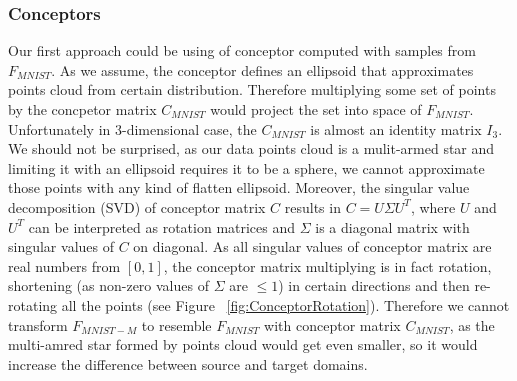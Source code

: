 \documentclass{article}
\begin{document}
\subsubsection{Conceptors}
\par
Our first approach could be using of conceptor computed with samples from $F_{MNIST}$. As we assume, the conceptor defines an ellipsoid that approximates points cloud from certain distribution. Therefore multiplying some set of points by the concpetor matrix $C_{MNIST}$ would project the set into space of $F_{MNIST}$. Unfortunately in 3-dimensional case, the $C_{MNIST}$ is almost an identity matrix $I_{3}$. We should not be surprised, as our data points cloud is a mulit-armed star and limiting it with an ellipsoid requires it to be a sphere, we cannot approximate those points with any kind of flatten ellipsoid. Moreover, the singular value decomposition (SVD) of conceptor matrix $C$ results in $C = U\Sigma U^{T}$, where $U$ and $U^{T}$ can be interpreted as rotation matrices and $\Sigma$ is a diagonal matrix with singular values of $C$ on diagonal. As all singular values of conceptor matrix are real numbers from $[0,1]$, the conceptor matrix multiplying is in fact rotation, shortening (as non-zero values of $\Sigma$ are $\leq 1$) in certain directions and then re-rotating all the points (see Figure ~\ref{fig:ConceptorRotation}). Therefore we cannot transform $F_{MNIST-M}$ to resemble $F_{MNIST}$ with conceptor matrix $C_{MNIST}$, as the multi-amred star formed by points cloud would get even smaller, so it would increase the difference between source and target domains.
\end{document}
